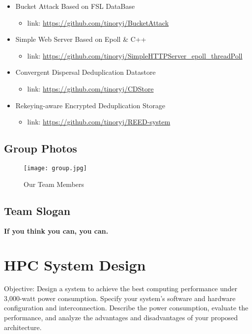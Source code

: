 \documentclass{mcmthesis}
\begin{document}
\begin{itemize}
	\item Bucket Attack Based on FSL DataBase
	\begin{itemize}
		\item link: \url{https://github.com/tinoryj/BucketAttack}
	\end{itemize}
	\item Simple Web Server Based on Epoll \& C++
	\begin{itemize}
		\item link: \url{https://github.com/tinoryj/SimpleHTTPServer_epoll_threadPoll}
	\end{itemize}
	\item Convergent Dispersal Deduplication Datastore
	\begin{itemize}
		\item link: \url{https://github.com/tinoryj/CDStore}
	\end{itemize}
	\item Rekeying-aware Encrypted Deduplication Storage
	\begin{itemize}
		\item link: \url{https://github.com/tinoryj/REED-system}
	\end{itemize}
\end{itemize}


\subsection{Group Photos}

\begin{figure}[!h]
\small
\centering
\texttt{[image: group.jpg]}
\caption{Our Team Members}
\label{fig:Our Team Members}
\end{figure}


\subsection{Team Slogan}

\textbf{If you think you can, you can.}




\section{HPC System Design}

\par Objective: Design a system to achieve the best computing performance under 3,000-watt power consumption. Specify your system’s software and hardware configuration and interconnection. Describe the power consumption, evaluate the performance, and analyze the advantages and disadvantages of your proposed architecture.
\end{document}
